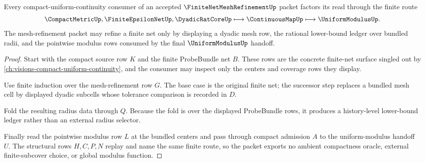 \begin{theorem}
\label{thm:finite-net-mesh-refinement-uniform-modulus-handoff}
Every compact-uniform-continuity consumer of an accepted $\FiniteNetMeshRefinementUp$ packet factors its read through the finite route
$$
\CompactMetricUp,\FiniteEpsilonNetUp,\DyadicRatCoreUp
\longmapsto \ContinuousMapUp
\longmapsto \UniformModulusUp .
$$
The mesh-refinement packet may refine a finite net only by displaying a dyadic mesh row, the rational lower-bound ledger over bundled radii, and the pointwise modulus rows consumed by the final $\UniformModulusUp$ handoff.
\end{theorem}
\begin{proof}
Start with the compact source row $K$ and the finite ProbeBundle net $B$. These rows are the concrete finite-net surface singled out by \autoref{ch:visions-compact-uniform-continuity}, and the consumer may inspect only the centers and coverage rows they display.

Use finite induction over the mesh-refinement row $G$. The base case is the original finite net; the successor step replaces a bundled mesh cell by displayed dyadic subcells whose tolerance comparison is recorded in $D$.

Fold the resulting radius data through $Q$. Because the fold is over the displayed ProbeBundle rows, it produces a history-level lower-bound ledger rather than an external radius selector.

Finally read the pointwise modulus row $L$ at the bundled centers and pass through compact admission $A$ to the uniform-modulus handoff $U$. The structural rows $H,C,P,N$ replay and name the same finite route, so the packet exports no ambient compactness oracle, external finite-subcover choice, or global modulus function.
\end{proof}



